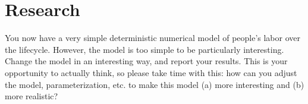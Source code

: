 \documentclass[11pt]{article}
\begin{document}
\clearpage
\section{Research}
You now have a very simple deterministic numerical model of people's labor over the lifecycle.  However, the model is too simple to be particularly interesting.  Change the model in an interesting way, and report your results.  This is your opportunity to actually think, so please take time with this:  how can you adjust the model, parameterization, etc. to make this model (a) more interesting and (b) more realistic?
\end{document}
